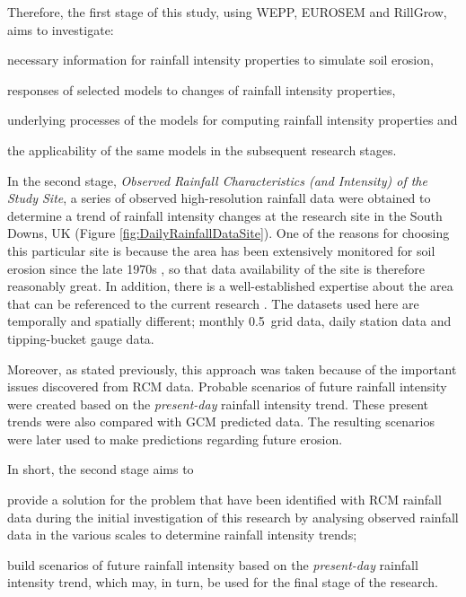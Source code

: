 Therefore, the first stage of this study, using WEPP, EUROSEM and RillGrow, aims
to investigate:\
\begin{inparaenum}[1)]
  \item necessary information for rainfall intensity properties to simulate soil
erosion,
  \item responses of selected models to changes of rainfall intensity
properties,
  \item underlying processes of the models for computing rainfall intensity
properties and
  \item the applicability of the same models in the subsequent research stages.
\end{inparaenum}

In the second stage, \textsl{Observed Rainfall Characteristics (and Intensity)
of the Study Site}, a series of observed high-resolution rainfall data were
obtained to determine a trend of rainfall intensity changes at the research site
in the South Downs, UK (Figure \ref{fig:DailyRainfallDataSite}). One of the
reasons for choosing this particular site is because the area has been
extensively monitored for soil erosion since the late 1970s
\citep{boardman1995-177,boardman2003-176}, so that data availability of the site
is therefore reasonably great. In addition, there is a well-established
expertise about the area that can be referenced to the current research
\citep{boardman1995-177,favis-mortlock1995-365,favis-mortlock1997-79,
favis-mortlock1998-141,boardman2001-346,boardman2003-176}. The datasets used
here are temporally and spatially different; monthly 0.5\textdegree\ grid data,
daily station data and tipping-bucket gauge data.

Moreover, as stated previously, this approach was taken because of the important
issues discovered from RCM data. Probable scenarios of future rainfall intensity
were created based on the \textit{present-day} rainfall intensity trend. These
present trends were also compared with GCM predicted data. The resulting
scenarios were later used to make predictions regarding future erosion.

In short, the second stage aims to
\begin{inparaenum}[1)]
  \item provide a solution for the problem that have been identified with RCM
rainfall data during the initial investigation of this research by analysing
observed rainfall data in the various scales to determine rainfall intensity
trends;
  \item build scenarios of future rainfall intensity based on the
\textit{present-day} rainfall intensity trend, which may, in turn, be used for
the final stage of the research.
\end{inparaenum}


